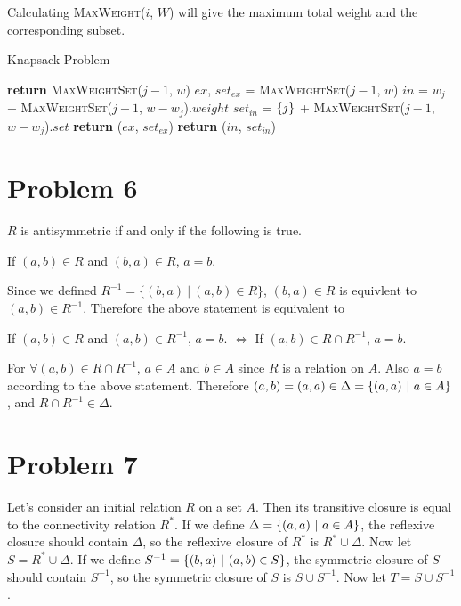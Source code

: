 \documentclass[10pt]{article}
\begin{document}
\begin{enumerate}[leftmargin=*]
    \vspace{1mm}
    Calculating \textsc{MaxWeight}($i$, $W$) will give the maximum total weight and the corresponding subset.
    \begin{algorithm}[H]
        \caption{Knapsack Problem}\label{alg:knapsack_set}
        \begin{algorithmic}
                \State \textbf{return} \textsc{MaxWeightSet}($j-1$, $w$)
            \Else
                \State $ex$, ${set}_{ex}$ = \textsc{MaxWeightSet}($j-1$, $w$)
                \State $in$ = $w_j$ + \textsc{MaxWeightSet}($j-1$, $w-w_j$).$weight$
                \State ${set}_{in}$ = $\qty{j}$ + \textsc{MaxWeightSet}($j-1$, $w-w_j$).$set$
                    \State \textbf{return} ($ex$, ${set}_{ex}$) 
                \Else
                \State \textbf{return} ($in$, ${set}_{in}$) 
                \EndIf
            \EndIf
            \EndFunction
        \end{algorithmic}
    \end{algorithm}
\end{enumerate}

\section*{Problem 6}
$R$ is antisymmetric if and only if the following is true.
\begin{center}
    If $(a, b) \in R$ and $(b, a) \in R$, $a = b$.
\end{center}
Since we defined $R^{-1}=\{(b,a)~|~(a,b)\in R\}$, $(b, a) \in R$ is equivlent to $(a, b) \in R^{-1}$.
Therefore the above statement is equivalent to
\begin{center}
    If $(a, b) \in R$ and $(a, b) \in R^{-1}$, $a = b$. $\Leftrightarrow$ If $(a, b) \in R \cap R^{-1}$, $a = b$.
\end{center}
For $\forall (a, b) \in R \cap R^{-1}$, $a \in A$ and $b \in A$ since $R$ is a relation on $A$. Also $a = b$ according to the above statement.
Therefore $(a, b) = (a, a) \in \Delta = \qty{(a, a) ~|~ a \in A}$, and $R \cap R^{-1} \in \Delta$.

\section*{Problem 7}
Let's consider an initial relation $R$ on a set $A$.
Then its transitive closure is equal to the connectivity relation $R^*$.
If we define $\Delta = \qty{(a, a) ~|~ a \in A}$, the reflexive closure should contain $\Delta$, so the reflexive closure of $R^*$ is $R^* \cup \Delta$.
Now let $S = R^* \cup \Delta$. 
If we define $S^{-1} = \qty{(b,a)~|~(a,b)\in S}$, the symmetric closure of $S$ should contain $S^{-1}$, so the symmetric closure of $S$ is $S \cup S^{-1}$. Now let $T = S \cup S^{-1}$.
\end{document}
